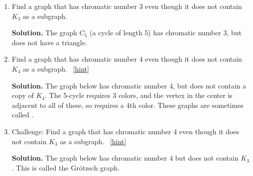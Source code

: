 \documentclass{book}
\begin{document}
\setcounter{project}{43}
\addtocounter{project}{-1}
\begin{activity}[]\label{activity-36}
\leavevmode%
\begin{enumerate}[font=\bfseries,label=(\alph*),ref=\alph*]
\item\label{task-58} \hypertarget{p-402}{}%
Find a graph that has chromatic number 3 even though it does not contain \(K_3\) as a subgraph.%
\par\smallskip%
\noindent\textbf{Solution.}\hypertarget{solution-42}{}\quad%
\hypertarget{p-403}{}%
The graph \(C_5\) (a cycle of length 5) has chromatic number 3, but does not have a triangle.%
\item\label{task-59} \hypertarget{p-404}{}%
Find a graph that has chromatic number 4 even though it does not contain \(K_4\) as a subgraph.%
~\hfill{\tiny\hyperlink{a-43.b}{[hint]}\hypertarget{q-43.b}{}}\par\smallskip%
\noindent\textbf{Solution.}\hypertarget{solution-43}{}\quad%
\hypertarget{p-406}{}%
The graph below has chromatic number 4, but does not contain a copy of \(K_4\).  The 5-cycle requires 3 colors, and the vertex in the center is adjacent to all of these, so requires a 4th color.  These graphs are sometimes called .%
\begin{sidebyside}{1}{0.4}{0.4}{0}
\begin{sbspanel}{0.2}
\end{sbspanel}
\end{sidebyside}
\item\label{task-60} \hypertarget{p-407}{}%
Challenge: Find a graph that has chromatic number 4 even though it does not contain \(K_3\) as a subgraph.%
~\hfill{\tiny\hyperlink{a-43.c}{[hint]}\hypertarget{q-43.c}{}}\par\smallskip%
\noindent\textbf{Solution.}\hypertarget{solution-44}{}\quad%
\hypertarget{p-409}{}%
The graph below has chromatic number 4 but does not contain \(K_3\).  This is called the Grötzsch graph.%
\begin{sidebyside}{1}{0.35}{0.35}{0}
\begin{sbspanel}{0.3}
\end{sbspanel}
\end{sidebyside}
\end{enumerate}
\end{activity}
\end{document}
